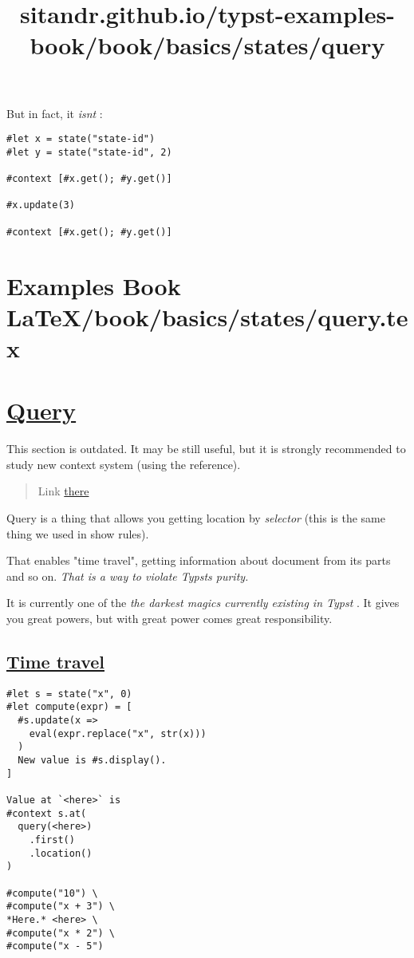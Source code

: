 But in fact, it \emph{isn\textquotesingle t} :

\begin{verbatim}
#let x = state("state-id")
#let y = state("state-id", 2)

#context [#x.get(); #y.get()]

#x.update(3)

#context [#x.get(); #y.get()]
\end{verbatim}

\pandocbounded{}


\section{Examples Book LaTeX/book/basics/states/query.tex}
\title{sitandr.github.io/typst-examples-book/book/basics/states/query}

\section{\texorpdfstring{\hyperref[query]{Query}}{Query}}\label{query}

This section is outdated. It may be still useful, but it is strongly
recommended to study new context system (using the reference).

\begin{quote}
Link \href{https://typst.app/docs/reference/meta/query/}{there}
\end{quote}

Query is a thing that allows you getting location by \emph{selector}
(this is the same thing we used in show rules).

That enables "time travel", getting information about document from its
parts and so on. \emph{That is a way to violate Typst\textquotesingle s
purity.}

It is currently one of the \emph{the darkest magics currently existing
in Typst} . It gives you great powers, but with great power comes great
responsibility.

\subsection{\texorpdfstring{\hyperref[time-travel]{Time
travel}}{Time travel}}\label{time-travel}

\begin{verbatim}
#let s = state("x", 0)
#let compute(expr) = [
  #s.update(x =>
    eval(expr.replace("x", str(x)))
  )
  New value is #s.display().
]

Value at `<here>` is
#context s.at(
  query(<here>)
    .first()
    .location()
)

#compute("10") \
#compute("x + 3") \
*Here.* <here> \
#compute("x * 2") \
#compute("x - 5")
\end{verbatim}

